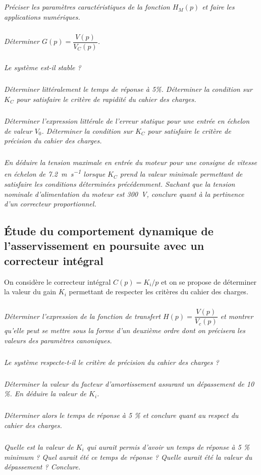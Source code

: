 \documentclass[10pt,fleqn]{article} %
\begin{document}
\subparagraph{}\textit{Préciser les paramètres caractéristiques de la fonction $H_M (p)$ et faire les applications numériques.}
\subparagraph{}\textit{Déterminer $G(p)=\dfrac{V(p)}{V_C(p)}$.}

\subparagraph{}\textit{Le système est-il stable ?}

\subparagraph{}\textit{Déterminer littéralement le temps de réponse à 5\%. Déterminer la condition sur $K_C$ pour satisfaire le critère de rapidité du cahier des charges. }

\subparagraph{}\textit{ Déterminer l’expression littérale de l’erreur statique pour une entrée en échelon de valeur $V_0$. Déterminer la condition sur $K_C$ pour satisfaire le critère de précision du cahier des charges.  }

\subparagraph{}\textit{En déduire la tension maximale en entrée du moteur pour une consigne de vitesse en échelon de \SI{7,2}{m.s^{-1}} lorsque $K_C$ prend la valeur minimale permettant de satisfaire les conditions déterminées précédemment. Sachant que la tension nominale d'alimentation du moteur est  \SI{300}{V}, conclure quant à la pertinence d’un 
correcteur proportionnel. }

\subsection*{Étude du comportement dynamique de l’asservissement en poursuite avec un correcteur intégral }

On considère le correcteur intégral $C(p)=K_i/p$ et on se propose de déterminer la valeur du gain $K_i$ permettant de respecter les critères du cahier des charges. 


\subparagraph{}\textit{Déterminer l’expression de la fonction de transfert $H(p)=\dfrac{V(p)}{V_c(p)}$ et montrer qu’elle peut se mettre sous la forme d’un deuxième ordre dont on précisera les valeurs des paramètres canoniques.}

\subparagraph{}\textit{Le système respecte-t-il le critère de précision du cahier des charges ? }

\subparagraph{}\textit{Déterminer la valeur du facteur d’amortissement assurant un dépassement de 10 \%. En déduire la valeur de $K_i$. }

\subparagraph{}\textit{Déterminer alors le temps de réponse à 5 \% et conclure quant au respect du cahier des charges. }

\subparagraph{}\textit{Quelle est la valeur de $K_i$ qui aurait permis d’avoir un temps de réponse à 5 \% minimum ? Quel aurait été ce temps de réponse ? Quelle aurait été la valeur du dépassement ? Conclure. }
\end{document}
